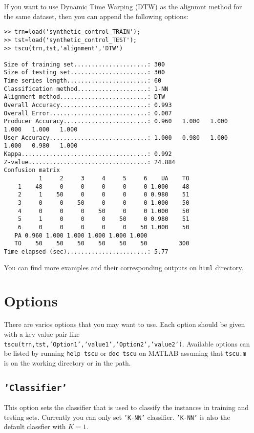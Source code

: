 \documentclass{article}
\begin{document}
If you want to use Dynamic Time Warping (DTW) as the alignmnt method for the same dataset, then you can append the following options:
\begin{scriptsize}
\begin{verbatim}
>> trn=load('synthetic_control_TRAIN');
>> tst=load('synthetic_control_TEST');
>> tscu(trn,tst,'alignment','DTW')

Size of training set.....................: 300
Size of testing set......................: 300
Time series length.......................: 60
Classification method....................: 1-NN
Alignment method.........................: DTW
Overall Accuracy.........................: 0.993   
Overall Error............................: 0.007   
Producer Accuracy........................: 0.960   1.000   1.000   1.000   1.000   1.000   
User Accuracy............................: 1.000   0.980   1.000   1.000   0.980   1.000   
Kappa....................................: 0.992   
Z-value..................................: 24.884  
Confusion matrix
          1     2     3     4     5     6    UA    TO 
    1    48     0     0     0     0     0 1.000    48 
    2     1    50     0     0     0     0 0.980    51 
    3     0     0    50     0     0     0 1.000    50 
    4     0     0     0    50     0     0 1.000    50 
    5     1     0     0     0    50     0 0.980    51 
    6     0     0     0     0     0    50 1.000    50 
   PA 0.960 1.000 1.000 1.000 1.000 1.000 
   TO    50    50    50    50    50    50         300 
Time elapsed (sec).......................: 5.77  
\end{verbatim}
\end{scriptsize}


You can find more examples and their corresponding outputs on \verb|html| directory.
\section{Options}
There are varios options that you may want to use. Each option should be given with a key-value pair like \texttt{tscu(trn,tst,'Option1','value1','Option2','value2')}. Available options can be listed by running \texttt{help tscu} or \texttt{doc tscu} on MATLAB assuming that \texttt{tscu.m} is on the working directory or in the path.

\subsection{\texttt{'Classifier'}}
This option sets the classifier that is used to classify the instances in training and testing sets. Currently you can only set \texttt{'K-NN'} classifier. \texttt{'K-NN'} is also the default classfier with $K=1$.
\end{document}
